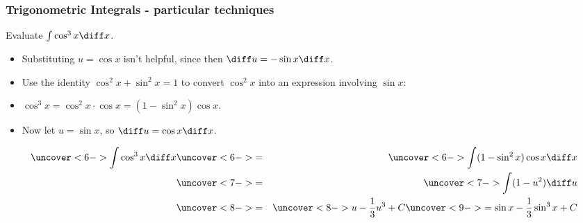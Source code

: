 \begin{frame}
\frametitle{Trigonometric Integrals - particular techniques}
\begin{example} %
Evaluate $\int \cos^3 x \diff x$.
\begin{itemize}
\item<2->  Substituting $u =\cos x$ isn't helpful, since then $\diff u = -\sin x \diff x$.
\item<3->  Use the identity $\cos^2 x + \sin^2 x = 1$ to convert $\cos^2 x$ into an expression involving $\sin x$:
\item<4-| alert@6>  $\cos^3 x = \cos^2 x \cdot \cos x = (1 - \sin^2 x)\cos x$.
\item<5-| alert@7>  Now let $u = \sin x$, so $\diff u = \cos x \diff x$.
\end{itemize}
\abovedisplayskip=0pt
\belowdisplayskip=0pt
\begin{eqnarray*}
\uncover<6->{%
\int \cos^3 x \diff x 
}%
& \uncover<6->{ = } &%
\uncover<6->{%
\int (1-\sin^2 x)\cos x\diff x
}\\%
& \uncover<7->{ = } &%
\uncover<7->{%
\int (1-u^2)\diff u
}\\%
& \uncover<8->{ = } &%
\uncover<8->{%
u - \frac{1}{3}u^3 + C
}%
\uncover<9->{%
 = \sin x - \frac{1}{3}\sin^3 x + C
}%
\end{eqnarray*}
\end{example}
\end{frame}
